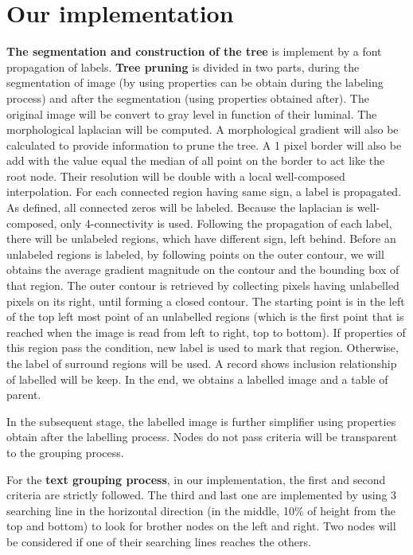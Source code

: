 \documentclass[12pt,a4paper,draft]{article}
\begin{document}
\section{Our implementation}
\textbf{The segmentation and construction of the tree} is implement by a font propagation of labels. \textbf{Tree pruning} is divided in two parts, during the segmentation of image (by using properties can be obtain during the labeling process) and after the segmentation (using properties obtained after). The original image will be convert to gray level in function of their luminal. The morphological laplacian will be computed. A morphological gradient will also be calculated to provide information to prune the tree. A 1 pixel border will also be add with the value equal the median of all point on the border to act like the root node. Their resolution will be double with a local well-composed interpolation. For each connected region having same sign, a label is propagated. As defined, all connected zeros will be labeled. Because the laplacian is well-composed, only 4-connectivity is used. Following the propagation of each label, there will be unlabeled regions, which have different sign, left behind. Before an unlabeled regions is labeled, by following points on the outer contour, we will obtains the average gradient magnitude on the contour and the bounding box of that region. The outer contour is retrieved by collecting pixels having unlabelled pixels on its right, until forming a closed contour. The starting point is in the left of the top left most point of an unlabelled regions (which is the first point that is reached when the image is read from left to right, top to bottom). If properties of this region pass the condition, new label is used to mark that region. Otherwise, the label of surround regions will be used. A record shows inclusion relationship of labelled will be keep. In the end, we obtains a labelled image and a table of parent. 


In the subsequent stage, the labelled image is further simplifier using properties obtain after the labelling process. Nodes do not pass criteria will be transparent to the grouping process. 


For the \textbf{text grouping process}, in our implementation, the first and second criteria are strictly followed. The third and last one are implemented by using 3 searching line in the horizontal direction (in the middle, 10\% of height from the top and bottom) to look for brother nodes on the left and right. Two nodes will be considered if one of their searching lines reaches the others.  
\end{document}
